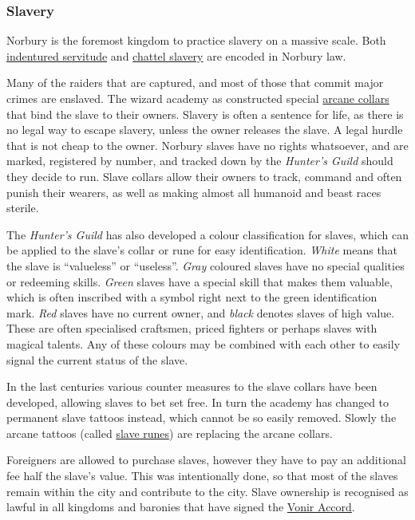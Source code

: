 \subsubsection{Slavery}

Norbury is the foremost kingdom to practice slavery on a massive scale. Both
\hyperref[sec:Indentured Servitude]{indentured servitude} and
\hyperref[sec:Unregulated Slavery]{chattel slavery} are encoded in Norbury
law.

Many of the raiders that are captured, and most of those that commit major
crimes are enslaved. The wizard academy as constructed special
\hyperref[sec:Slave Band]{arcane collars} that bind the slave to their
owners. Slavery is often a sentence for life, as there is no legal way to
escape slavery, unless the owner releases the slave.  A legal hurdle that is
not cheap to the owner. Norbury slaves have no rights whatsoever, and are
marked, registered by number, and tracked down by the \emph{Hunter's Guild}
should they decide to run. Slave collars allow their owners to track, command
and often punish their wearers, as well as making almost all humanoid and
beast races sterile.

The \emph{Hunter's Guild} has also developed a colour classification for
slaves, which can be applied to the slave's collar or rune for easy
identification.  \emph{White} means that the slave is ``valueless'' or
``useless''. \emph{Gray} coloured slaves have no special qualities or
redeeming skills. \emph{Green} slaves have a special skill that makes them
valuable, which is often inscribed with a symbol right next to the green
identification mark. \emph{Red} slaves have no current owner, and \emph{black}
denotes slaves of high value. These are often specialised craftsmen, priced
fighters or perhaps slaves with magical talents. Any of these colours may be
combined with each other to easily signal the current status of the slave.

In the last centuries various counter measures to the slave collars have been
developed, allowing slaves to bet set free. In turn the academy has changed to
permanent slave tattoos instead, which cannot be so easily removed. Slowly the
arcane tattoos (called \hyperref[sec:Slave Mark]{slave runes}) are replacing
the arcane collars.

Foreigners are allowed to purchase slaves, however they have to pay an
additional fee half the slave's value. This was intentionally done, so that
most of the slaves remain within the city and contribute to the city. Slave
ownership is recognised as lawful in all kingdoms and baronies that have
signed the \hyperref[sec:Vonir Accord]{Vonir Accord}.

